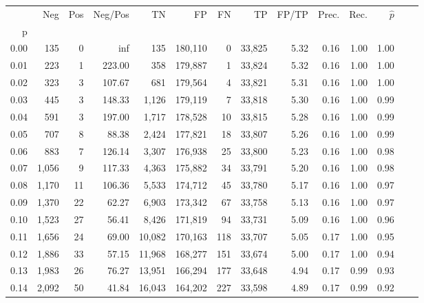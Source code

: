 \begin{tabular}{rrrrrrrrrrrrrr}
\toprule
{} &    Neg &  Pos & Neg/Pos &       TN &       FP &      FN &      TP & FP/TP & Prec. &  Rec. & $\hat{p}$ \\
p    &        &      &         &          &          &         &         &       &       &       &           \\
\midrule
0.00 &    135 &    0 &     inf &      135 &  180,110 &       0 &  33,825 &  5.32 &  0.16 &  1.00 &      1.00 \\
0.01 &    223 &    1 &  223.00 &      358 &  179,887 &       1 &  33,824 &  5.32 &  0.16 &  1.00 &      1.00 \\
0.02 &    323 &    3 &  107.67 &      681 &  179,564 &       4 &  33,821 &  5.31 &  0.16 &  1.00 &      1.00 \\
0.03 &    445 &    3 &  148.33 &    1,126 &  179,119 &       7 &  33,818 &  5.30 &  0.16 &  1.00 &      0.99 \\
0.04 &    591 &    3 &  197.00 &    1,717 &  178,528 &      10 &  33,815 &  5.28 &  0.16 &  1.00 &      0.99 \\
0.05 &    707 &    8 &   88.38 &    2,424 &  177,821 &      18 &  33,807 &  5.26 &  0.16 &  1.00 &      0.99 \\
0.06 &    883 &    7 &  126.14 &    3,307 &  176,938 &      25 &  33,800 &  5.23 &  0.16 &  1.00 &      0.98 \\
0.07 &  1,056 &    9 &  117.33 &    4,363 &  175,882 &      34 &  33,791 &  5.20 &  0.16 &  1.00 &      0.98 \\
0.08 &  1,170 &   11 &  106.36 &    5,533 &  174,712 &      45 &  33,780 &  5.17 &  0.16 &  1.00 &      0.97 \\
0.09 &  1,370 &   22 &   62.27 &    6,903 &  173,342 &      67 &  33,758 &  5.13 &  0.16 &  1.00 &      0.97 \\
0.10 &  1,523 &   27 &   56.41 &    8,426 &  171,819 &      94 &  33,731 &  5.09 &  0.16 &  1.00 &      0.96 \\
0.11 &  1,656 &   24 &   69.00 &   10,082 &  170,163 &     118 &  33,707 &  5.05 &  0.17 &  1.00 &      0.95 \\
0.12 &  1,886 &   33 &   57.15 &   11,968 &  168,277 &     151 &  33,674 &  5.00 &  0.17 &  1.00 &      0.94 \\
0.13 &  1,983 &   26 &   76.27 &   13,951 &  166,294 &     177 &  33,648 &  4.94 &  0.17 &  0.99 &      0.93 \\
0.14 &  2,092 &   50 &   41.84 &   16,043 &  164,202 &     227 &  33,598 &  4.89 &  0.17 &  0.99 &      0.92 \\

\end{tabular}
